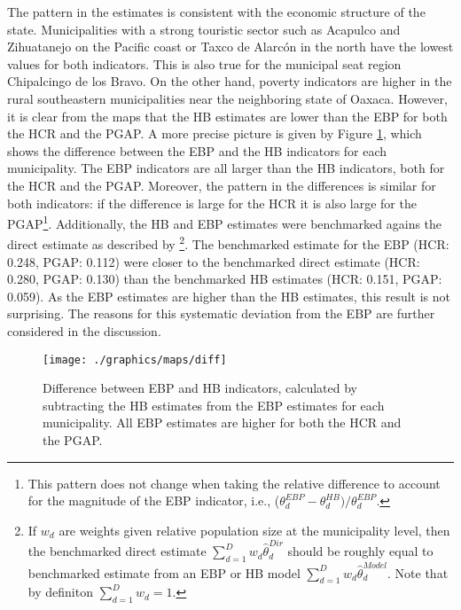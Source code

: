 The pattern in the estimates is consistent with the economic structure of the state.
Municipalities with a strong touristic sector such as Acapulco and Zihuatanejo on the Pacific coast or Taxco de Alarcón in the north have the lowest values for both indicators.
This is also true for the municipal seat region Chipalcingo de los Bravo.
On the other hand, poverty indicators are higher in the rural southeastern municipalities near the neighboring state of Oaxaca.
However, it is clear from the maps that the HB estimates are lower than the EBP for both the HCR and the PGAP.
A more precise picture is given by Figure \ref{fig:diff}, which shows the difference between the EBP and the HB indicators for each municipality.
The EBP indicators are all larger than the HB indicators, both for the HCR and the PGAP.
Moreover, the pattern in the differences is similar for both indicators: if the difference is large for the HCR it is also large for the PGAP\footnote{This pattern does not change when taking the relative difference to account for the magnitude of the EBP indicator, i.e., ($\theta_d^{EBP} - \theta_d^{HB}) / \theta_d^{EBP}$.}.
Additionally, the HB and EBP estimates were benchmarked agains the direct estimate as described by \cite{pfeffermann_new_2013}\footnote{If $w_d$ are weights given relative population size at the municipality level, then the benchmarked direct estimate $\sum_{d=1}^D w_d \hat \theta_d^{Dir} $ should be roughly equal to benchmarked estimate from an EBP or HB model $\sum_{d=1}^D w_d \hat \theta_d^{Model} $.
Note that by definiton $\sum_{d=1}^D w_d = 1$.}.
The benchmarked estimate for the EBP (HCR: 0.248, PGAP: 0.112) were closer to the benchmarked direct estimate (HCR: 0.280, PGAP: 0.130) than the benchmarked HB estimates (HCR: 0.151, PGAP: 0.059).
As the EBP estimates are higher than the HB estimates, this result is not surprising.
The reasons for this systematic deviation from the EBP are further considered in the discussion.

\begin{figure}
    \centering
    \texttt{[image: ./graphics/maps/diff]}
    \caption[Difference between EBP and HB estimates.]{Difference between EBP and HB indicators, calculated by subtracting the HB estimates from the EBP estimates for each municipality. All EBP estimates are higher for both the HCR and the PGAP.}
    \label{fig:diff}
\end{figure}

